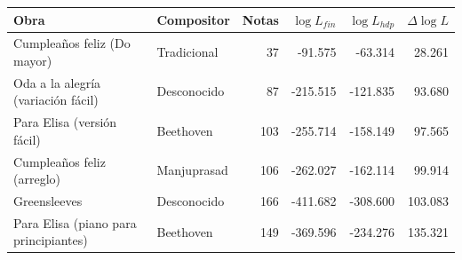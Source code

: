 \begin{tabular}{@{}p{4.2cm}p{2.1cm}rrrr@{}}
\hline
Obra & Compositor & Notas & $\log L_{fin}$ & $\log L_{hdp}$ & $\Delta \log L$ \\
\hline
Cumpleaños feliz (Do mayor) & Tradicional & 37 & -91.575 & -63.314 & 28.261 \\
Oda a la alegría (variación fácil) & Desconocido & 87 & -215.515 & -121.835 & 93.680 \\
Para Elisa (versión fácil) & Beethoven & 103 & -255.714 & -158.149 & 97.565 \\
Cumpleaños feliz (arreglo) & Manjuprasad & 106 & -262.027 & -162.114 & 99.914 \\
Greensleeves & Desconocido & 166 & -411.682 & -308.600 & 103.083 \\
Para Elisa (piano para principiantes) & Beethoven & 149 & -369.596 & -234.276 & 135.321 \\
\hline
\end{tabular}
